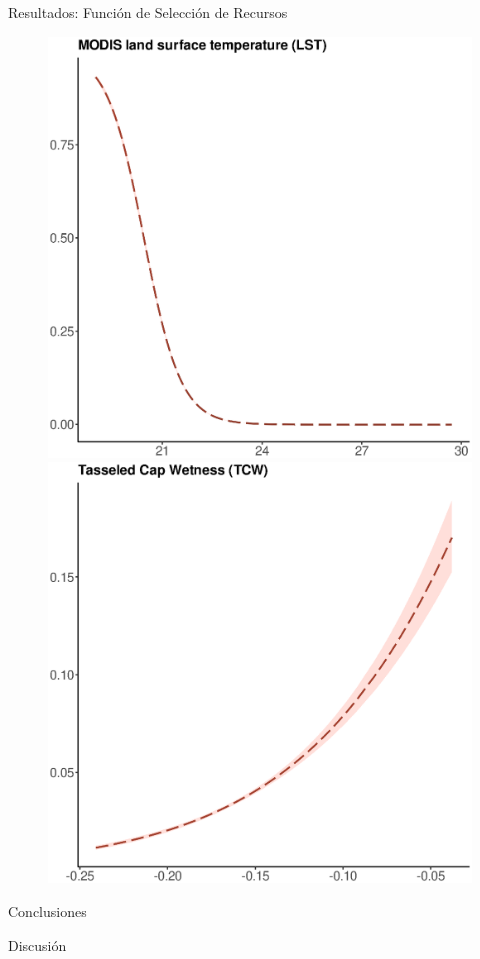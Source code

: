 \documentclass[11pt]{beamer}
\begin{document}
\begin{frame}{Resultados: Función de Selección de Recursos}
\begin{figure}
            \includegraphics[scale=0.23]{images/m_effects_temperature}
            \includegraphics[scale=0.23]{images/m_effects_wetness}
        \end{figure}
\end{frame}

\begin{frame}{Conclusiones}

\end{frame}

\begin{frame}{Discusión}

\end{frame}
\end{document}
